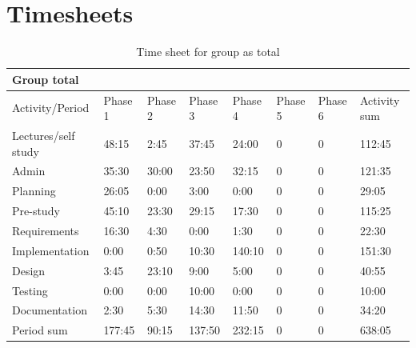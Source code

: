\documentclass[11pt]{book}
\begin{document}
\chapter{Timesheets}
\begin{table}[H]
\centering
\begin{tabular}{| l | l | l | l | l | l | l | l |}
    \hline
    Group total         &          &          &          &          &             &             &              \\ \hline                        
    Activity/Period     & Phase 1  & Phase 2  & Phase  3 & Phase 4  & Phase 5     & Phase 6     & Activity sum \\ \hline
    Lectures/self study & 48:15    & 2:45     & 37:45    & 24:00    & 0           & 0           & 112:45       \\ \hline
    Admin               & 35:30    & 30:00    & 23:50    & 32:15    & 0           & 0           & 121:35       \\ \hline
    Planning            & 26:05    & 0:00     & 3:00     & 0:00     & 0           & 0           & 29:05        \\ \hline
    Pre-study           & 45:10    & 23:30    & 29:15    & 17:30    & 0           & 0           & 115:25       \\ \hline
    Requirements        & 16:30    & 4:30     & 0:00     & 1:30     & 0           & 0           & 22:30        \\ \hline
    Implementation      & 0:00     & 0:50     & 10:30    & 140:10   & 0           & 0           & 151:30       \\ \hline
    Design              & 3:45     & 23:10    & 9:00     & 5:00     & 0           & 0           & 40:55        \\ \hline
    Testing             & 0:00     & 0:00     & 10:00    & 0:00     & 0           & 0           & 10:00        \\ \hline
    Documentation       & 2:30     & 5:30     & 14:30    & 11:50    & 0           & 0           & 34:20        \\ \hline
    Period sum          & 177:45   & 90:15    & 137:50   & 232:15   & 0           & 0           & 638:05       \\ \hline
\end{tabular}
\caption{Time sheet for group as total}
\label{tab:appendix_timesheets_group}
\end{table}
\end{document}
